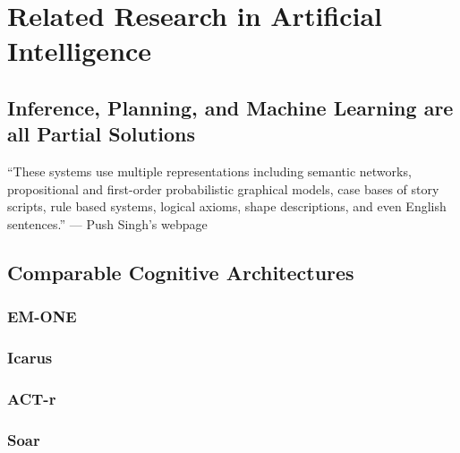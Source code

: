 \chapter{Related Research in Artificial Intelligence}

\section{Inference, Planning, and Machine Learning are all Partial Solutions}

``These systems use multiple representations including semantic networks, propositional and first-order probabilistic graphical models, case bases of story scripts, rule based systems, logical axioms, shape descriptions, and even English sentences.'' --- Push Singh's webpage

\section{Comparable Cognitive Architectures}

\subsection{EM-ONE}
\subsection{Icarus}
\subsection{ACT-r}
\subsection{Soar}

